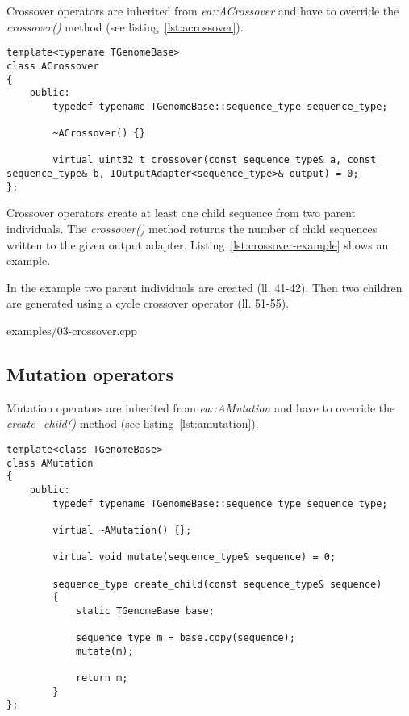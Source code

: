 \documentclass[a4paper]{article}
\begin{document}
Crossover operators are inherited from \textit{ea::ACrossover} and have to override the \textit{crossover()} method (see listing~\ref{lst:acrossover}). 

\begin{lstlisting}[caption=ACrossover,label=lst:acrossover]
template<typename TGenomeBase>
class ACrossover
{
	public:
		typedef typename TGenomeBase::sequence_type sequence_type;

		~ACrossover() {}

		virtual uint32_t crossover(const sequence_type& a, const sequence_type& b, IOutputAdapter<sequence_type>& output) = 0;
};
\end{lstlisting}

Crossover operators create at least one child sequence from two parent individuals. The \textit{crossover()} method returns the number of child sequences written to the given output adapter. Listing~\ref{lst:crossover-example} shows an example.

In the example two parent individuals are created (ll. 41-42). Then two children are generated using a cycle crossover operator (ll. 51-55).

\begin{lstinputlisting}[caption=crossover operators,label=lst:crossover-example]{examples/03-crossover.cpp}
\end{lstinputlisting}

\subsection{Mutation operators}

Mutation operators are inherited from \textit{ea::AMutation} and have to override the \textit{create\_child()} method (see listing~\ref{lst:amutation}). 

\begin{lstlisting}[caption=AMutation,label=lst:amutation]
template<class TGenomeBase>
class AMutation
{
	public:
		typedef typename TGenomeBase::sequence_type sequence_type;

		virtual ~AMutation() {};

		virtual void mutate(sequence_type& sequence) = 0;

		sequence_type create_child(const sequence_type& sequence)
		{
			static TGenomeBase base;

			sequence_type m = base.copy(sequence);
			mutate(m);

			return m;
		}
};
\end{lstlisting}
\end{document}
